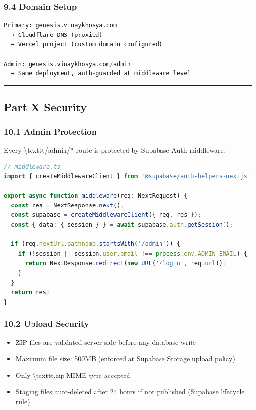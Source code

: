 \documentclass[11pt,a4paper]{article}
\begin{document}
\subsubsection*{9.4 Domain Setup}

\begin{lstlisting}[language=Python]
Primary: genesis.vinaykhosya.com
  → Cloudflare DNS (proxied)
  → Vercel project (custom domain configured)

Admin: genesis.vinaykhosya.com/admin
  → Same deployment, auth-guarded at middleware level
\end{lstlisting}

\noindent\rule{\textwidth}{0.4pt}

\subsection*{Part X  Security}

\subsubsection*{10.1 Admin Protection}

Every \textbackslash{}texttt{/admin/*} route is protected by Supabase Auth middleware:

\begin{lstlisting}[language=typescript]
// middleware.ts
import { createMiddlewareClient } from '@supabase/auth-helpers-nextjs'

export async function middleware(req: NextRequest) {
  const res = NextResponse.next();
  const supabase = createMiddlewareClient({ req, res });
  const { data: { session } } = await supabase.auth.getSession();

  if (req.nextUrl.pathname.startsWith('/admin')) {
    if (!session || session.user.email !== process.env.ADMIN_EMAIL) {
      return NextResponse.redirect(new URL('/login', req.url));
    }
  }
  return res;
}
\end{lstlisting}

\subsubsection*{10.2 Upload Security}

\begin{itemize}
  \item ZIP files are validated server-side before any database write
  \item Maximum file size: 500MB (enforced at Supabase Storage upload policy)
  \item Only \textbackslash{}texttt{.zip} MIME type accepted
  \item Staging files auto-deleted after 24 hours if not published (Supabase lifecycle rule)
\end{itemize}
\end{document}
